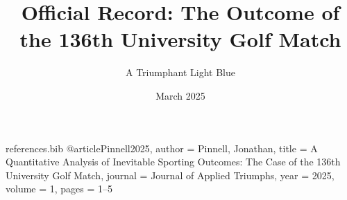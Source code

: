 \begin{filecontents}{references.bib}
	@article{Pinnell2025,
		author  = {Pinnell, Jonathan},
		title   = {A Quantitative Analysis of Inevitable Sporting Outcomes: The Case of the 136th University Golf Match},
		journal = {Journal of Applied Triumphs},
		year    = {2025},
		volume  = {1},
		pages   = {1--5}
	}
\end{filecontents}

\documentclass[12pt]{article}

\usepackage{amsmath}    %
\usepackage{amsthm}     %
\usepackage{graphicx}   %

\usepackage[style=nature, backend=biber]{biblatex}

\usepackage{hyperref}   %

\newtheorem{theorem}{Theorem}

\title{Official Record: The Outcome of the 136th University Golf Match}
\author{A Triumphant Light Blue}
\date{March 2025}


	
	\maketitle
	\thispagestyle{empty}
	
	\section{A Foregone Conclusion}
	
	This document presents a brief, scientific analysis of the Cambridge University Golf Club's (CUGC) comprehensive victory over their esteemed rivals from Oxford. The results, as you will see, were never in doubt.	\footnote{The main purpose is actually to showcase fancy-preview-plus. Hover over the references to see a preview of them without having to scroll to the relevant part of the document and potentially lose your place (amazing I know)!}
	
	\subsection{The Fundamental Formula for Victory}
	The outcome can be described by the simple, elegant formula shown in Equation~\ref{eq:obvious}. Hover over the reference to see the mathematical ``proof''.
	\begin{equation}
		 = (_{\text{CUGC}})^\infty - (_{\text{Oxford}})^0
		\label{eq:obvious}
	\end{equation}
	
